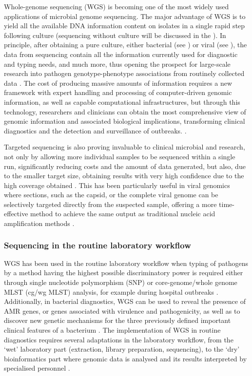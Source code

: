 Whole-genome sequencing (WGS) is becoming one of the most widely used applications of microbial genome sequencing. 
The major advantage of WGS is to yield all the available DNA information content on isolates in a single rapid step following culture (sequencing without culture will be discussed in the ). 
In principle, after obtaining a pure culture, either bacterial (see ) or viral (see ), the data from sequencing contain all the information currently used for diagnostic and typing needs, and much more, thus opening the prospect for large-scale research into pathogen genotype-phenotype associations from routinely collected data \citep{didelot_transforming_2012}.
The cost of producing massive amounts of information requires a new framework with expert handling and processing of computer-driven genomic information, as well as capable computational infrastructures, but through this technology, researchers and clinicians can obtain the most comprehensive view of genomic information and associated biological implications, transforming clinical diagnostics and the detection and surveillance of outbreaks. \citep{cirulli_uncovering_2010, nature_reviews_genetics_genomic_2019, goodwin_coming_2016}.

Targeted sequencing is also proving invaluable to clinical microbial and research, not only by allowing more individual samples to be sequenced within a single run, significantly reducing costs and the amount of data generated, but also, due to the smaller target size, obtaining results with very high confidence due to the high coverage obtained \citep{goodwin_coming_2016}.
This has been particularly useful in viral genomics where sections, such as the capsid, or the complete viral genome can be selectively targeted directly from the suspected sample, offering a more time-effective method to achieve the same output as traditional nucleic acid amplification methods \citep{cassedy_virus_2021}. 

\subsubsection{Sequencing in the routine laboratory workflow} \label{sssec:sequencing_routine_lab}

WGS has been used in the routine laboratory workflow when typing of pathogens by a method having the highest possible discriminatory power is required either through single nucleotide polymorphism (SNP) or core-genome/whole genome MLST (cg/wg MLST) analysis, for example during hospital outbreaks \citep{tagini_bacterial_2017}. 
Additionally, in bacterial diagnostics, WGS can be used to reveal the presence of AMR genes, or genes associated with virulence and pathogenicity, as well as to discover new genetic mechanisms for the three previously defined important clinical features of a bacterium \citep{rossen_practical_2018}. 
The implementation of WGS in routine diagnostics requires several adaptations in the laboratory workflow, from the ‘wet’ laboratory part (extraction, library preparation, sequencing), to the ‘dry’ bioinformatics part where genomic data is analysed and its results interpreted by specialised personnel \citep{rossen_practical_2018}. 

